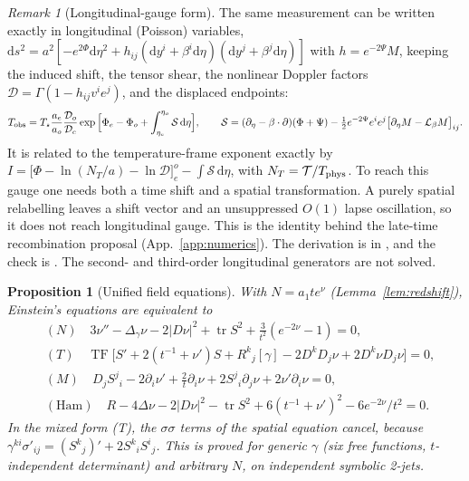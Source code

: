 \documentclass[11pt]{article}
\newtheorem{proposition}[theorem]{Proposition}
\theoremstyle{definition}
\theoremstyle{remark}
\newtheorem{remark}[theorem]{Remark}
\newcommand{\dd}{\mathrm{d}}
\newcommand{\T}{\mathcal{T}}
\newcommand{\TF}{\operatorname{TF}}
\begin{document}
\begin{remark}[Longitudinal-gauge form]\label{rem:longitudinal}
The same measurement can be written exactly in longitudinal (Poisson) variables,
$\dd s^2=a^2[-e^{2\Phi}\dd\eta^2+h_{ij}(\dd y^i+\beta^i\dd\eta)(\dd y^j+\beta^j\dd\eta)]$ with
$h=e^{-2\Psi}M$, keeping the induced shift, the tensor shear, the nonlinear Doppler factors
$\mathcal D=\Gamma(1-h_{ij}v^ie^j)$, and the displaced endpoints:
\[
T_{\rm obs}=T_\star\frac{a_e}{a_o}\frac{\mathcal D_o}{\mathcal D_e}
\exp\Big[\Phi_e-\Phi_o+\int_{\eta_e}^{\eta_o}\mathcal S\,\dd\eta\Big],
\qquad
\mathcal S=(\partial_\eta-\beta\cdot\partial)(\Phi+\Psi)-\tfrac12e^{-2\Psi}e^ie^j\big[\partial_\eta M-\mathcal L_\beta M\big]_{ij}.
\]
It is related to the temperature-frame exponent exactly by
$I=\big[\Phi-\ln(N_T/a)-\ln\mathcal D\big]_e^o-\int\mathcal S\,\dd\eta$, with $N_T=\T/T_{\rm phys}$.
To reach this gauge one needs both a time shift and a spatial transformation. A purely spatial
relabelling leaves a shift vector and an unsuppressed $O(1)$ lapse oscillation, so it does not
reach longitudinal gauge. This is the identity behind the late-time recombination proposal
(App.~\ref{app:numerics}). The derivation is in , and the
check is . The second- and third-order
longitudinal generators are not solved.
\end{remark}

\begin{proposition}[Unified field equations]\label{prop:fe}
With $N=a_1te^{\nu}$ (Lemma~\ref{lem:redshift}), Einstein's equations are equivalent to
\begin{align}
&(N)\quad 3\nu''-\Delta_\gamma\nu-2|D\nu|^2+\operatorname{tr}S^2+\tfrac{3}{t^2}(e^{-2\nu}-1)=0,\\
&(T)\quad \TF\big[S'+2(t^{-1}+\nu')S+R^k{}_j[\gamma]-2D^kD_j\nu+2D^k\nu D_j\nu\big]=0,\\
&(M)\quad D_jS^j{}_i-2\partial_i\nu'+\tfrac2t\partial_i\nu+2S^j{}_i\partial_j\nu+2\nu'\partial_i\nu=0,\\
&(\mathrm{Ham})\quad R-4\Delta\nu-2|D\nu|^2-\operatorname{tr}S^2+6(t^{-1}+\nu')^2-6e^{-2\nu}/t^2=0.
\end{align}
In the mixed form (T), the $\sigma\sigma$ terms of the spatial equation cancel, because
$\gamma^{ki}\sigma'_{ij}=(S^k{}_j)'+2S^k{}_iS^i{}_j$. This is proved for generic
$\gamma$ (six free functions, $t$-independent determinant) and arbitrary $N$, on independent
symbolic 2-jets.
\end{proposition}
\end{document}
